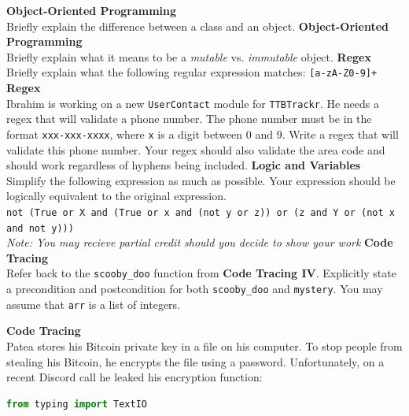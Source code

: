 \documentclass[letterpaper,12pt,addpoints]{exam}
\begin{document}
\begin{questions}
    \question[5] \textbf{Object-Oriented Programming} \\
    Briefly explain the difference between a class and an object.
    \bigskip
    \bigskip
    \bigskip
    \bigskip
    \question[5] \textbf{Object-Oriented Programming} \\
    Briefly explain what it means to be a \textit{mutable} vs. \textit{immutable} object.
    \bigskip
    \bigskip
    \bigskip
    \bigskip
    \question[5] \textbf{Regex} \\
    Briefly explain what the following regular expression matches: \texttt{[a-zA-Z0-9]+} %
    \bigskip
    \bigskip
    \bigskip   
    \bigskip
    \question[5] \textbf{Regex} \\
    Ibrahim is working on a new \texttt{UserContact} module for \texttt{TTBTrackr}. He needs a regex that will validate a phone number. The phone number must be in the format \texttt{xxx-xxx-xxxx}, where \texttt{x} is a digit between 0 and 9. Write a regex that will validate this phone number. Your regex should also validate the area code and should work regardless of hyphens being included. 
    \bigskip
    \bigskip
    \bigskip   
    \bigskip
    \question[5] \textbf{Logic and Variables} \\
    Simplify the following expression as much as possible. Your expression should be logically equivalent to the original expression. \\
        \texttt{not (True or X and (True or x and (not y or z)) or (z and Y or (not x and not y)))
        } \\
    \textit{Note: You may recieve partial credit should you decide to show your work}
    \clearpage
    \question[10] \textbf{Code Tracing} \\
    Refer back to the \texttt{scooby\_doo} function from \textbf{Code Tracing IV}. Explicitly state a precondition and postcondition for both \texttt{scooby\_doo} and \texttt{mystery}. You may assume that \texttt{arr} is a list of integers.
    \bigskip
    \bigskip
    \bigskip   
    \bigskip
    
    \question[10] \textbf{Code Tracing} \\
    Patea stores his Bitcoin private key in a file on his computer. To stop people from stealing his Bitcoin, he encrypts the file using a password. Unfortunately, on a recent Discord call he leaked his encryption function: 
    \begin{lstlisting}[language=Python, style=mystyle]
from typing import TextIO


\end{lstlisting}
\end{questions}
\end{document}

